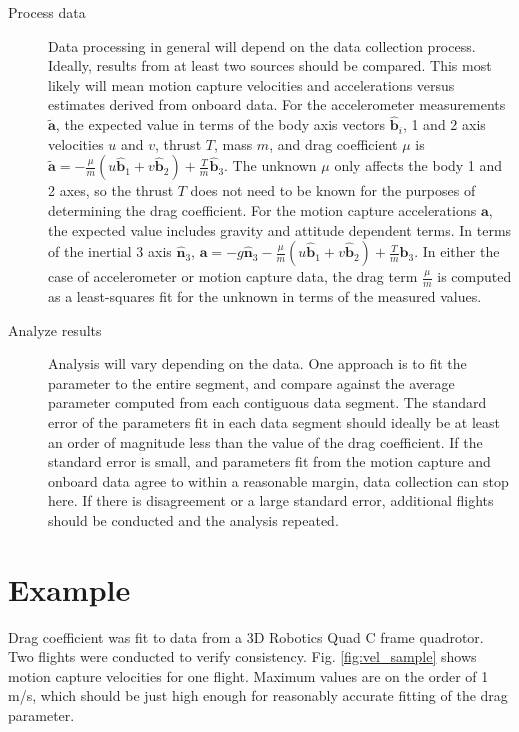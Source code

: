 \documentclass{article}
\newcommand{\B}[1]{\textbf{#1}} %
\newcommand{\U}[1]{\hat{\textbf{#1}}} %
\begin{document}
\begin{description}
\item[ Process data ] Data processing in general will depend on the data collection process. Ideally, results from at least two sources should be compared. This most likely will mean motion capture velocities and accelerations versus estimates derived from onboard data. For the accelerometer measurements $\tilde{\B{a}}$, the expected value in terms of the body axis vectors $\U{b}_i$, 1 and 2 axis velocities $u$ and $v$, thrust $T$, mass $m$, and drag coefficient $\mu$ is $\tilde{\B{a}} = -\frac{\mu}{m} (u\U{b}_1 + v\U{b}_2) + \frac{T}{m}\U{b}_3$. The unknown $\mu$ only affects the body 1 and 2 axes, so the thrust $T$ does not need to be known for the purposes of determining the drag coefficient. For the motion capture accelerations $\B{a}$, the expected value includes gravity and attitude dependent terms. In terms of the inertial 3 axis $\U{n}_3$, $\B{a} = -g \U{n}_3 -\frac{\mu}{m} (u\U{b}_1 + v\U{b}_2) + \frac{T}{m}\U{b}_3 $. In either the case of accelerometer or motion capture data, the drag term $\frac{\mu}{m}$ is computed as a least-squares fit for the unknown in terms of the measured values.
\item[Analyze results] Analysis will vary depending on the data. One approach is to fit the parameter to the entire segment, and compare against the average parameter computed from each contiguous data segment. The standard error of the parameters fit in each data segment should ideally be at least an order of magnitude less than the value of the drag coefficient. If the standard error is small, and parameters fit from the motion capture and onboard data agree to within a reasonable margin, data collection can stop here. If there is disagreement or a large standard error, additional flights should be conducted and the analysis repeated.
\end{description}

\section{Example}

Drag coefficient was fit to data from a 3D Robotics Quad C frame quadrotor. Two flights were conducted to verify consistency. Fig. \ref{fig:vel_sample} shows motion capture velocities for one flight. Maximum values are on the order of 1 m/s, which should be just high enough for reasonably accurate fitting of the drag parameter.
\end{document}
